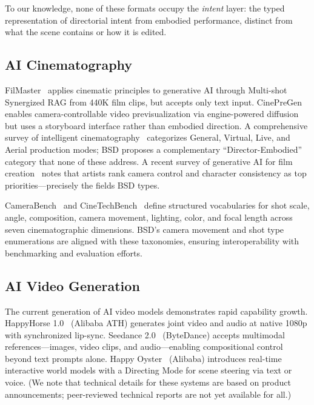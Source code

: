 \documentclass{article}
\begin{document}
To our knowledge, none of these formats occupy the \emph{intent} layer: the typed representation of directorial intent from embodied performance, distinct from what the scene contains or how it is edited.

\subsection{AI Cinematography}

FilMaster~\cite{filmaster2026} applies cinematic principles to generative AI through Multi-shot Synergized RAG from 440K film clips, but accepts only text input. CinePreGen~\cite{cinepregen2024} enables camera-controllable video previsualization via engine-powered diffusion but uses a storyboard interface rather than embodied direction. A comprehensive survey of intelligent cinematography~\cite{intelligentcinematography2024} categorizes General, Virtual, Live, and Aerial production modes; BSD proposes a complementary ``Director-Embodied'' category that none of these address. A recent survey of generative AI for film creation~\cite{genaifilm2025} notes that artists rank camera control and character consistency as top priorities---precisely the fields BSD types.

CameraBench~\cite{camerabench2025} and CineTechBench~\cite{cinetechbench2025} define structured vocabularies for shot scale, angle, composition, camera movement, lighting, color, and focal length across seven cinematographic dimensions. BSD's camera movement and shot type enumerations are aligned with these taxonomies, ensuring interoperability with benchmarking and evaluation efforts.

\subsection{AI Video Generation}

The current generation of AI video models demonstrates rapid capability growth. HappyHorse 1.0~\cite{happyhorse2026} (Alibaba ATH) generates joint video and audio at native 1080p with synchronized lip-sync. Seedance 2.0~\cite{seedance2026} (ByteDance) accepts multimodal references---images, video clips, and audio---enabling compositional control beyond text prompts alone. Happy Oyster~\cite{happyoyster2026} (Alibaba) introduces real-time interactive world models with a Directing Mode for scene steering via text or voice. (We note that technical details for these systems are based on product announcements; peer-reviewed technical reports are not yet available for all.)
\end{document}
